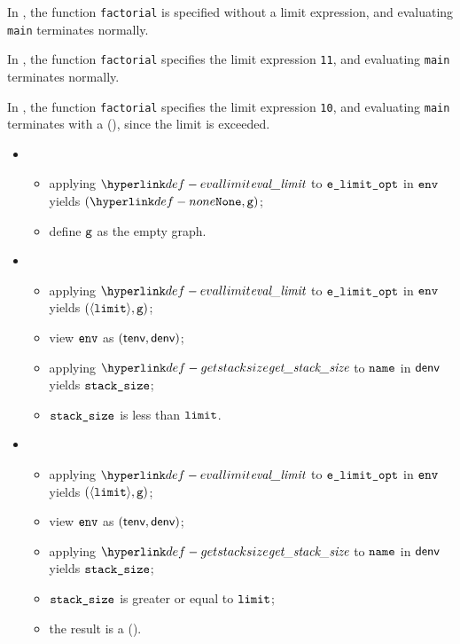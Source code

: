 In , the function \verb|factorial| is specified without a limit expression,
and evaluating \verb|main| terminates normally.

In , the function \verb|factorial| specifies the limit expression \verb|11|,
and evaluating \verb|main| terminates normally.

In , the function \verb|factorial| specifies the limit expression \verb|10|,
and evaluating \verb|main| terminates with a \dynamicerrorterm{} (\LimitExceeded), since the limit is exceeded.

\ProseParagraph
\OneApplies
\begin{itemize}
  \item {}
  \begin{itemize}
    \item applying $\evallimit$ to $\texttt{e\_limit\_opt}$ in $\texttt{env}$ yields $(\None, \vg)$\ProseOrDynErrorDiverging;
    \item define $\texttt{g}$ as the empty graph.
  \end{itemize}

  \item {}
  \begin{itemize}
    \item applying $\evallimit$ to $\texttt{e\_limit\_opt}$ in $\texttt{env}$ yields $(\langle\texttt{limit}\rangle, \texttt{g})$\ProseOrDynErrorDiverging;
    \item view $\texttt{env}$ as $(\textsf{tenv}, \textsf{denv})$;
    \item applying $\getstacksize$ to $\texttt{name}$ in $\textsf{denv}$ yields $\texttt{stack\_size}$;
    \item $\texttt{stack\_size}$ is less than $\texttt{limit}$.
  \end{itemize}

  \item {}
  \begin{itemize}
    \item applying $\evallimit$ to $\texttt{e\_limit\_opt}$ in $\texttt{env}$ yields $(\langle\texttt{limit}\rangle, \texttt{g})$\ProseOrDynErrorDiverging;
    \item view $\texttt{env}$ as $(\textsf{tenv}, \textsf{denv})$;
    \item applying $\getstacksize$ to $\texttt{name}$ in $\textsf{denv}$ yields $\texttt{stack\_size}$;
    \item $\texttt{stack\_size}$ is greater or equal to $\texttt{limit}$;
    \item the result is a \dynamicerrorterm{} (\LimitExceeded).
  \end{itemize}
\end{itemize}

